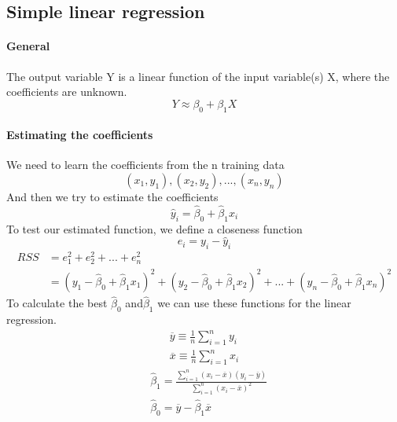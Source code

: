 \documentclass[../document.tex]{subfiles}
\begin{document}
	\subsection{Simple linear regression}
	\paragraph{General}
	The output variable Y is a linear function of the input variable(s) X, where the coefficients are unknown.
	\begin{equation}
		Y \approx \beta_{0} + \beta_{1}X
	\end{equation}
	\paragraph{Estimating the coefficients}
	We need to learn the coefficients from the n training data
	\begin{equation}
	(x_{1},y_{1}),(x_{2},y_{2}),...,(x_{n},y_{n})
	\end{equation}
	And then we try to estimate the coefficients
	\begin{equation}
	\hat{y}_{i} = \hat{\beta}_{0} + \hat{\beta}_{1}x_{i}
	\end{equation}
	To test our estimated function, we define a closeness function
	\begin{equation}
		e_{i}=y_{i}-\hat{y}_{i}
	\end{equation}
	\begin{equation}
	\begin{split}
		RSS &= e^2_{1}+e^2_{2}+...+e^2_{n}\\
			&= (y_{1}-\hat{\beta}_{0} + \hat{\beta}_{1}x_{1})^2+
			(y_{2}-\hat{\beta}_{0} + \hat{\beta}_{1}x_{2})^2+...+
			(y_{n}-\hat{\beta}_{0} + \hat{\beta}_{1}x_{n})^2
	\end{split}
	\end{equation}
	To calculate the best \(\hat{\beta}_{0}\) and\(\hat{\beta}_{1}\) we can use these functions for the linear regression.
	\begin{equation}
	\begin{split}
		\overline{y}\equiv\frac{1}{n}\sum_{i=1}^{n}y_{i}\\
		\overline{x}\equiv\frac{1}{n}\sum_{i=1}^{n}x_{i}
	\end{split}
	\end{equation}
	\begin{equation}
	\begin{split}
		&\hat{\beta}_{1}=\frac{\sum_{i=1}^{n}(x_{i}-\overline{x})(y_{i}-\overline{y})}{\sum_{i=1}^{n}(x_{i}-\overline{x})^2}\\
		&\hat{\beta}_{0}=\overline{y}-\hat{\beta}_{1}\overline{x}
	\end{split}
	\end{equation}
\end{document}
